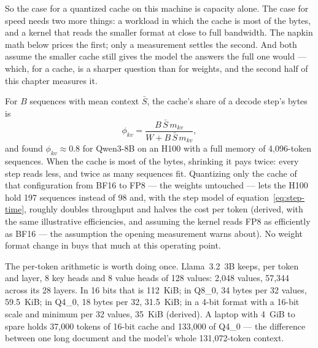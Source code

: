 So the case for a quantized cache on this machine is capacity alone. The case
for speed needs two more things: a workload in which the cache is most of the
bytes, and a kernel that reads the smaller format at close to full bandwidth.
The napkin math below prices the first; only a measurement settles the second.
And both assume the smaller cache still gives the model the answers the full
one would --- which, for a cache, is a sharper question than for weights, and
the second half of this chapter measures it.



For $B$ sequences with mean context $\bar{S}$, the cache's share of a decode
step's bytes is
\begin{equation}
\phi_{kv} = \frac{B\,\bar{S}\,m_{kv}}{W + B\,\bar{S}\,m_{kv}},
\label{eq:kv-share}
\end{equation}
and  found $\phi_{kv}\approx0.8$ for Qwen3-8B on an H100 with
a full memory of 4,096-token sequences. When the cache is most of the bytes,
shrinking it pays twice: every step reads less, and twice as many sequences
fit. Quantizing only the cache of that configuration from BF16 to FP8 --- the
weights untouched --- lets the H100 hold 197 sequences instead of 98 and, with
the step model of equation~\eqref{eq:step-time}, roughly doubles throughput
and halves the cost per token (derived, with the same illustrative
efficiencies, and assuming the kernel reads FP8 as efficiently as BF16 --- the
assumption the opening measurement warns about). No weight format change in
 buys that much at this operating point.

The per-token arithmetic is worth doing once. Llama~3.2~3B keeps, per token and
layer, 8 key heads and 8 value heads of 128 values: 2,048 values, 57,344 across
its 28 layers. In 16 bits that is 112~KiB; in Q8\_0, 34 bytes per 32 values,
59.5~KiB; in Q4\_0, 18 bytes per 32, 31.5~KiB; in a 4-bit format with a 16-bit
scale and minimum per 32 values, 35~KiB (derived). A laptop with 4~GiB to spare
holds 37,000 tokens of 16-bit cache and 133,000 of Q4\_0 --- the difference
between one long document and the model's whole 131,072-token context.


